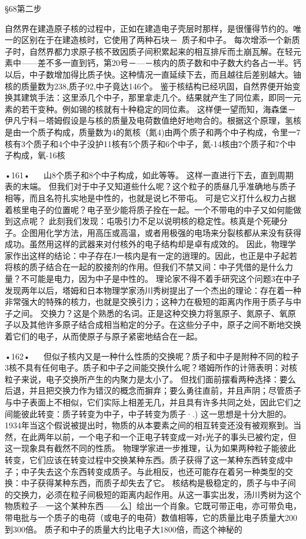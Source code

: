 §68第二步

自然界在建造原子核的过程中，正如在建造电子壳层时那样，是很懂得节约的。唯一的区别在于在建造核时，它使用了两种石块－~质子和中子。
每次增添一个新质子时，自然界都力求原子核不致因质子间积累起来的相互排斥而土崩瓦解。在轻元素中——差不多一直到钙，第20号－—－核内的质子数和中子数大约各占一半。钙以后，中子数增加得比质子快。这种情况一直延续下去，而且越往后差别越大。铀核的质量数为238,质子92,中子竟达146个。
鉴于核结构已经巩固，自然界便开始变换其建筑手法：这里添几个中子，那里拿走几个。结果就产生了同位素，即同一元素的若干变种。例如锡的核就有十种稳定的同位素。
这样便一望而知，海森堡－伊凡宁科－塔姆假设是与核的质量及电荷数值绝好地吻合的。根据这个原理，氢核是由一个质子构成，质量数为4的氮核（氮4)由两个质子和两个中子构成，令里一7核有3个质子和4个中子没护11核有5个质子和6个中子，氮-14核由7个质子和7个中子构成，氧-16核

•161•
  
山8个质子和8个中子构成，如此等等。
这样一直进行下去，直到周期表的末端。
但我们对于中子又知道些什么呢？这个粒子的质昼几乎准确地与质子相等，而且名符扎实地是中性的，也就是说匕不带屯。
可是它义打什么权力占据着核里电子的位置呢？电子至少能将质子拴在一起。一个不带电的中子又如何能做到这点呢？
此刻我们发现：屯吸引力不足以说明核的稳定性。核真是个死硬分子。企图用化学方法，用高压或高温，或者用极强的电场来分裂核都从来没有获得成功。虽然用这样的武器来对付核外的电子结构却是卓有成效的。
因此，物理学家作出这样的结论：中子存在J一核内是有一定的逍理的。因此，也正是中子起若将核的质子结合在一起的胶接剂的作用。但我们不禁又间：中子凭借的是什么力量？不可能是电力，因为中子是中性的。
理论家不得不着手研究这个问题3在中子发现两年以后，塔姆和日本物理学家汤川秀树提出了一个杰出的理论：存在着一种非常强大的特殊的核力，也就是交换引力；这种力在极短的距离内作用于质子与中子之间。
交换力？这是个熟悉的名词。正是这种交换力将氢原子、氮原子、氧原子以及其他许多原子结合成相当粕定的分子。在这些分子中，原子之间不断地交换着它们的电子，从而使原子与原子紧密地结合在一起。

•162•
  
但似子核内又是一种什么性质的交换呢？质子和中子是附种不同的粒子3核不具有任何电子。质子和中子之间能交换什么呢？塔姆所作的计筛表明：对核粒子来说，电子交换所产生的内聚力是太小了。
但找们面前摆看两种选择：要么后退，并且把交换力作为错汉的概念而摒弃；要么勇往直前，并且声阴；尽管质子与中子表面上不相似，它们实际上相差无几，并且具有许多共同之处，因此它们之间能彼此转变：质子转变为中子，中子转变为质子·.)
这一思想是十分大胆的。1934年当这个假说被提出时，物质的从本要素之间的相互转变还没有被观察到。当然，在此两年以前，一个电子和一个正电子转变成一对r光子的事头已被彴定，但这一现象具有截然不同的性质。
物理学家进一步推理，认为如果两种粒子能彼此转变，它们应该在转变过程中交换某种东西。质子获得了这一某种东西转变成中子；中子失去这个东西转变成质子。与此相反，也还可能存在着另一种类型的交换：中子获得某种东西，而质子却失去了它。
核结构是极稳定的，质子与中子间的交换力，必须在粒子间极短的距离内起作用。从这一事实出发，汤川秀树为这个物质粒子—一这个某种东西——么］绘出一个肖象。它既可带正电，亦可带负电，带电批与一个质子的电荷（或电子的电荷）数值相等，它的质量比电子质量大200到300倍。
质子和中子的质量大约比电子大1800倍，而这个神秘的

